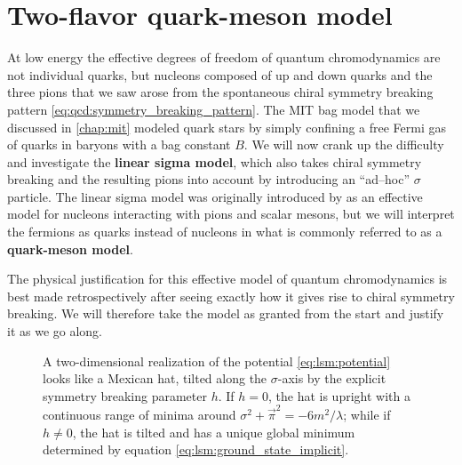 \chapter{Two-flavor quark-meson model}
\label{chap:lsm2f}

At low energy the effective degrees of freedom of quantum chromodynamics are not individual quarks,
but nucleons composed of up and down quarks and the three pions that we saw arose from the spontaneous chiral symmetry breaking pattern \eqref{eq:qcd:symmetry_breaking_pattern}.
The MIT bag model that we discussed in \cref{chap:mit} modeled quark stars by simply confining a free Fermi gas of quarks in baryons with a bag constant $B$.
We will now crank up the difficulty and investigate the \textbf{linear sigma model}, which also takes chiral symmetry breaking and the resulting pions into account by introducing an ``ad--hoc'' $\sigma$ particle.
The linear sigma model was originally introduced by \cite{ref:lsm_original} as an effective model for nucleons interacting with pions and scalar mesons,
but we will interpret the fermions as quarks instead of nucleons in what is commonly referred to as a \textbf{quark-meson model}.

The physical justification for this effective model of quantum chromodynamics is best made retrospectively after seeing exactly how it gives rise to chiral symmetry breaking.
We will therefore take the model as granted from the start and justify it as we go along.

\begin{figure}
\centering
{}
\caption{\label{fig:lsm:potential}%
	A two-dimensional realization of the potential \eqref{eq:lsm:potential} looks like a Mexican hat, tilted along the $\sigma$-axis by the explicit symmetry breaking parameter $h$.
	If $h = 0$, the hat is upright with a continuous range of minima around $\sigma^2 + \vec\pi^2 = -6m^2 / \lambda$;
	while if $h \neq 0$, the hat is tilted and has a unique global minimum determined by equation \eqref{eq:lsm:ground_state_implicit}.
}
\end{figure}

